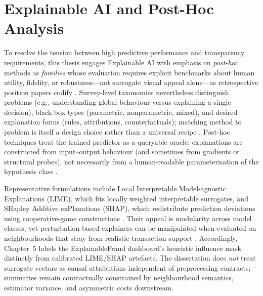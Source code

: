\section{Explainable AI and Post-Hoc Analysis}
To resolve the tension between high predictive performance and transparency requirements, this thesis engages Explainable AI with emphasis on \emph{post-hoc} methods as \emph{families} whose evaluation requires explicit benchmarks about human utility, fidelity, or robustness---not surrogate visual appeal alone---as retrospective position papers codify \cite{doshi_velez_kim_interpretability_2017}. Survey-level taxonomies nevertheless distinguish problems (e.g., understanding global behaviour versus explaining a single decision), black-box types (parametric, nonparametric, mixed), and desired explanation forms (rules, attributions, counterfactuals); matching method to problem is itself a design choice rather than a universal recipe \cite{guidotti_blackbox_survey2018,xai_survey}. Post-hoc techniques treat the trained predictor as a queryable oracle: explanations are constructed from input--output behaviour (and sometimes from gradients or structural probes), not necessarily from a human-readable parameterisation of the hypothesis class \cite{guidotti_blackbox_survey2018,molnarInterpretableMachineLearningBook}.

Representative formulations include Local Interpretable Model-agnostic Explanations (LIME), which fits locally weighted interpretable surrogates, and SHapley Additive exPlanations (SHAP), which redistribute prediction deviations using cooperative-game constructions \cite{lime_original,shap_original}. Their appeal is modularity across model classes, yet perturbation-based explainers can be manipulated when evaluated on neighbourhoods that stray from realistic transaction support \cite{slack2020_fooling_lime_shap}. Accordingly, Chapter~5 labels the ExplainableFraud dashboard's heuristic influence mask distinctly from calibrated LIME/SHAP artefacts. The dissertation does \emph{not} treat surrogate vectors as causal attributions independent of preprocessing contracts; summaries remain contractually constrained by neighbourhood semantics, estimator variance, and asymmetric costs downstream.

